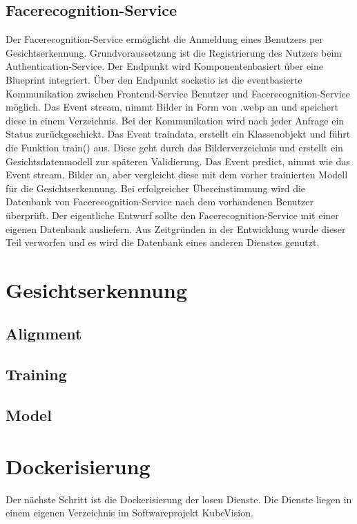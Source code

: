 \subsection{Facerecognition-Service}
Der Facerecognition-Service ermöglicht die Anmeldung eines Benutzers per Gesichtserkennung.
Grundvoraussetzung ist die Registrierung des Nutzers beim Authentication-Service.
Der Endpunkt wird Komponentenbasiert über eine Blueprint integriert.
Über den Endpunkt socketio ist die eventbasierte Kommunikation zwischen Frontend-Service Benutzer und Facerecognition-Service möglich.
Das Event stream, nimmt Bilder in Form von .webp an und speichert diese in einem Verzeichnis.
Bei der Kommunikation wird nach jeder Anfrage ein Status zurückgeschickt.
Das Event traindata, erstellt ein Klassenobjekt und führt die Funktion train() aus.
Diese geht durch das Bilderverzeichnis und erstellt ein Gesichtsdatenmodell zur späteren Validierung.
Das Event predict, nimmt wie das Event stream, Bilder an, aber vergleicht diese mit dem vorher trainierten Modell für die Gesichtserkennung.
Bei erfolgreicher Übereinstimmung wird die Datenbank von Facerecognition-Service nach dem vorhandenen Benutzer überprüft.
Der eigentliche Entwurf sollte den Facerecognition-Service mit einer eigenen Datenbank ausliefern.
Aus Zeitgründen in der Entwicklung wurde dieser Teil verworfen und es wird die Datenbank eines anderen Dienstes genutzt.


\section{Gesichtserkennung}
\subsection{Alignment}
\subsection{Training}
\subsection{Model}

\section{Dockerisierung}

Der nächste Schritt ist die Dockerisierung der losen Dienste.
Die Dienste liegen in einem eigenen Verzeichnis im Softwareprojekt KubeVision.

